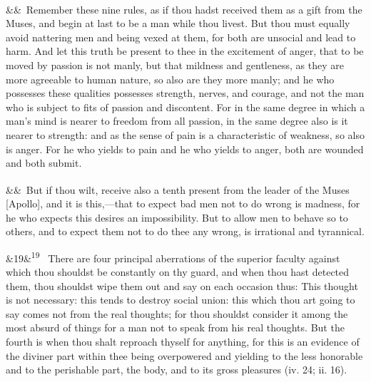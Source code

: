 \documentclass[12pt]{article}
\newcommand{\para}[1][]{\par\noindent\ifx&#1&\else\textsuperscript{\footnotesize #1}~\fi}
\begin{document}
\para Remember these nine rules, as if thou hadst received them as a gift from
the Muses, and begin at last to be a man while thou livest. But thou
must equally avoid nattering men and being vexed at them, for both are
unsocial and lead to harm. And let this truth be present to thee in the
excitement of anger, that to be moved by passion is not manly, but that
mildness and gentleness, as they are more agreeable to human nature, so
also are they more manly; and he who possesses these qualities possesses
strength, nerves, and courage, and not the man who is subject to fits of
passion and discontent. For in the same degree in which a man's mind is
nearer to freedom from all passion, in the same degree also is it nearer
to strength: and as the sense of pain is a characteristic of weakness,
so also is anger. For he who yields to pain and he who yields to anger,
both are wounded and both submit.

\para But if thou wilt, receive also a tenth present from the leader of the
Muses [Apollo], and it is this,---that to expect bad men not to do wrong
is madness, for he who expects this desires an impossibility. But to
allow men to behave so to others, and to expect them not to do thee any
wrong, is irrational and tyrannical.

\para[19] There are four principal aberrations of the superior faculty against
which thou shouldst be constantly on thy guard, and when thou hast
detected them, thou shouldst wipe them out and say on each occasion
thus: This thought is not necessary: this tends to destroy social union:
this which thou art going to say comes not from the real thoughts; for
thou shouldst consider it among the most absurd of things for a man not
to speak from his real thoughts. But the fourth is when thou shalt
reproach thyself for anything, for this is an evidence of the diviner
part within thee being overpowered and yielding to the less honorable
and to the perishable part, the body, and to its gross pleasures (iv.
24; ii. 16).
\end{document}
